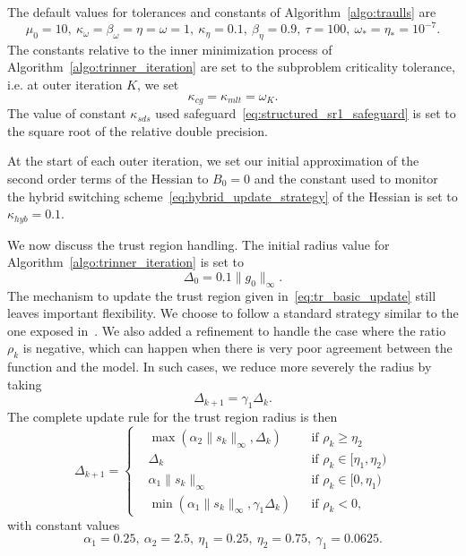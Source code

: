 The default values for tolerances and constants of Algorithm~\ref{algo:traulls} are
\[ \mu_0 = 10,\ \kappa_\omega = \beta_\omega = \eta = \omega = 1,\ \kappa_\eta = 0.1,\ \beta_\eta = 0.9,\ \tau = 100,\  \omega_*=\eta_* = 10^{-7}.\]
The constants relative to the inner minimization process of Algorithm~\ref{algo:trinner_iteration} are set to the subproblem criticality tolerance, i.e. at outer iteration $K$, we set
\[ \kappa_{cg} = \kappa_{mlt} = \omega_K.\]
The value of constant $\kappa_{sds}$ used safeguard~\eqref{eq:structured_sr1_safeguard} is set to the square root of the relative double precision.

At the start of each outer iteration, we set our initial approximation of the second order terms of the Hessian to $B_0 = 0$ and the constant used to monitor the hybrid switching scheme~\eqref{eq:hybrid_update_strategy} of the Hessian is set to $\kappa_{hyb}=0.1$.

We now discuss the trust region handling. The initial radius value for Algorithm~\ref{algo:trinner_iteration} is set to
\begin{equation*}
	\Delta_0 = 0.1\| g_0\|_\infty.
\end{equation*}
The mechanism to update the trust region given in~\eqref{eq:tr_basic_update} still leaves important flexibility. We choose to follow a standard strategy similar to the one exposed in~\cite[][Chapter 17]{conn-etal:2000}. We also added a refinement to handle the case where the ratio $\rho_k$ is negative, which can happen when there is very poor agreement between the function and the model. In such cases, we reduce more severely the radius by taking
\[\Delta_{k+1} = \gamma_1 \Delta_k.\]
The complete update rule for the trust region radius is then
\begin{equation*}
	\Delta_{k+1} = \left\{\begin{aligned}
		& \max\left(\alpha_2 \|s_k\|_\infty,\Delta_k\right) & &\text{if } \rho_k \ge \eta_2 \\
		& \Delta_k &  &\text{if } \rho_k \in [\eta_1,\eta_2) \\
		& \alpha_1\|s_k\|_\infty & &\text{if } \rho_k \in [0,\eta_1) \\
		& \min\left(\alpha_1 \|s_k\|_\infty,\gamma_1\Delta_k\right) & &\text{if } \rho_k < 0,
	\end{aligned}\right.
\end{equation*}
with constant values
\[\alpha_1 = 0.25,\ \alpha_2 = 2.5,\ \eta_1 = 0.25,\ \eta_2 = 0.75,\ \gamma_1 = 0.0625.\]
